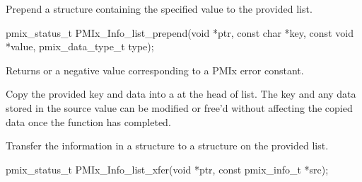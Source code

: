 
\summary

Prepend a  structure containing the specified value to the provided list.

\format

\cspecificstart
\begin{codepar}
pmix_status_t
PMIx_Info_list_prepend(void *ptr,
                       const char *key,
                       const void *value,
                       pmix_data_type_t type);
\end{codepar}
\cspecificend

\begin{arglist}
\end{arglist}

Returns  or a negative value corresponding to a PMIx error constant.

\descr

Copy the provided key and data into a  at the head of list. The key and any data stored in the source value can be modified or free'd without affecting the copied data once the function has completed.


\summary

Transfer the information in a  structure to a structure on the provided list.

\format

\cspecificstart
\begin{codepar}
pmix_status_t
PMIx_Info_list_xfer(void *ptr,
                    const pmix_info_t *src);
\end{codepar}
\cspecificend


\begin{arglist}
\end{arglist}

